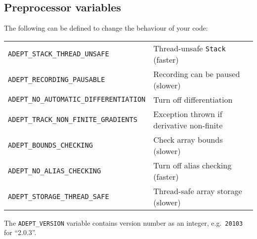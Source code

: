 \documentclass[10pt,a4,landscape]{article}
\def\code#1{\texttt{#1}}
\begin{document}
\subsection*{Preprocessor variables}
The following can be defined to change the behaviour of your code:\\
\begin{tabular}{ll}
\code{ADEPT\_STACK\_THREAD\_UNSAFE} & Thread-unsafe \code{Stack} (faster)\\
\code{ADEPT\_RECORDING\_PAUSABLE} & Recording can be paused (slower)\\
\code{ADEPT\_NO\_AUTOMATIC\_DIFFERENTIATION} & Turn off differentiation\\
\code{ADEPT\_TRACK\_NON\_FINITE\_GRADIENTS} & Exception thrown if derivative non-finite\\
\code{ADEPT\_BOUNDS\_CHECKING} & Check array bounds (slower)\\
\code{ADEPT\_NO\_ALIAS\_CHECKING} & Turn off alias checking (faster)\\
\code{ADEPT\_STORAGE\_THREAD\_SAFE} & Thread-safe array storage (slower)\\
\end{tabular}

The \code{ADEPT\_VERSION} variable contains version number as an
integer, e.g.\ \code{20103} for ``2.0.3''.
\onecolumn

\newpage

\def\Y{\textbf{Y}}
\def\r#1{\rotatebox{90}{#1}}
\end{document}
